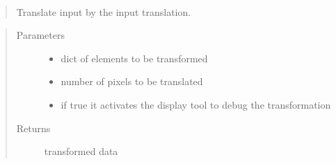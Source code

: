 \documentclass[letterpaper,10pt,english]{sphinxmanual}
\begin{document}

\begin{fulllineitems}
\label{\detokenize{ida_lib.operations:ida_lib.operations.transforms.translate}}~\begin{quote}

Translate input by the input translation.
\end{quote}
\begin{quote}\begin{description}
\item[{Parameters}] \leavevmode\begin{itemize}
\item {} 
 \textendash{} dict of elements to be transformed

\item {} 
 \textendash{} number of pixels to be translated

\item {} 
 \textendash{} if true it activates the display tool to debug the transformation

\end{itemize}

\item[{Returns}] \leavevmode
transformed data

\end{description}\end{quote}

\end{fulllineitems}

\end{document}
